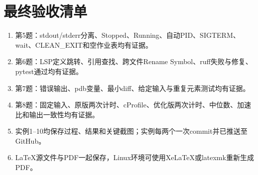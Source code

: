 \documentclass[UTF8,a4paper,11pt]{ctexart}
\begin{document}
\section{最终验收清单}
\begin{enumerate}
\item 第5题：stdout/stderr分离、Stopped、Running、自动PID、SIGTERM、wait、CLEAN\_EXIT和空作业表均有证据。
\item 第6题：LSP定义跳转、引用查找、跨文件Rename Symbol、ruff失败与修复、pytest通过均有证据。
\item 第7题：错误输出、pdb变量、最小diff、给定输入与重复元素测试均有证据。
\item 第8题：固定输入、原版两次计时、cProfile、优化版两次计时、中位数、加速比和输出一致性均有证据。
\item 实例1--10均保存过程、结果和关键截图；实例每两个一次commit并已推送至GitHub。
\item LaTeX源文件与PDF一起保存，Linux环境可使用XeLaTeX或latexmk重新生成PDF。
\end{enumerate}
\end{document}
